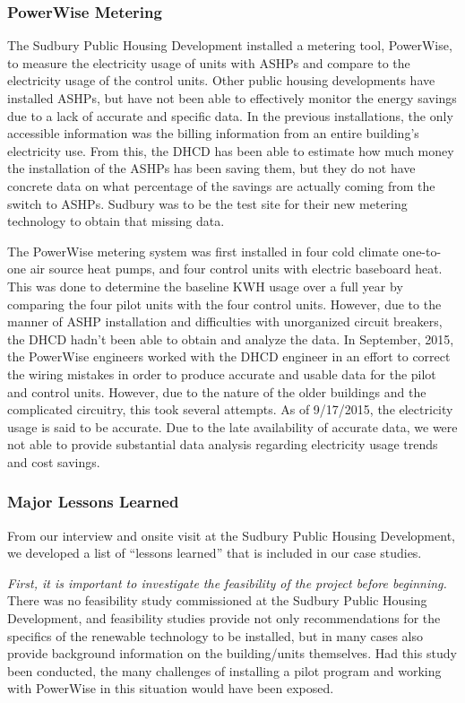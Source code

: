 \subsubsection{PowerWise Metering}
\par The Sudbury Public Housing Development installed a metering tool, PowerWise, to measure the electricity usage of units with ASHPs and compare to the electricity usage of the control units. Other public housing developments have installed ASHPs, but have not been able to effectively monitor the energy savings due to a lack of accurate and specific data. In the previous installations, the only accessible information was the billing information from an entire building’s electricity use. From this, the DHCD has been able to estimate how much money the installation of the ASHPs has been saving them, but they do not have concrete data on what percentage of the savings are actually coming from the switch to ASHPs. Sudbury was to be the test site for their new metering technology to obtain that missing data.
\par The PowerWise metering system was first installed in four cold climate one-to-one air source heat pumps, and four control units with electric baseboard heat. This was done to determine the baseline KWH usage over a full year by comparing the four pilot units with the four control units. However, due to the manner of ASHP installation and difficulties with unorganized circuit breakers, the DHCD hadn’t been able to obtain and analyze the data.  In September, 2015, the PowerWise engineers worked with the DHCD engineer in an effort to correct the wiring mistakes in order to produce accurate and usable data for the pilot and control units. However, due to the nature of the older buildings and the complicated circuitry, this took several attempts. As of 9/17/2015, the electricity usage is said to be accurate. Due to the late availability of accurate data, we were not able to provide substantial data analysis regarding electricity usage trends and cost savings.

\subsubsection{Major Lessons Learned}
\par From our interview and onsite visit at the Sudbury Public Housing Development, we developed a list of “lessons learned” that is included in our case studies.
\par \emph{First, it is important to investigate the feasibility of the project before beginning.} There was no feasibility study commissioned at the Sudbury Public Housing Development, and feasibility studies provide not only recommendations for the specifics of the renewable technology to be installed, but in many cases also provide background information on the building/units themselves. Had this study been conducted, the many challenges of installing a pilot program and working with PowerWise in this situation would have been exposed.

